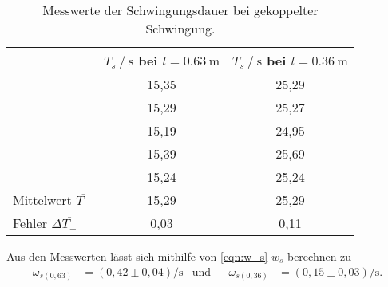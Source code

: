 \begin{table}[H]
  \centering
  \caption{Messwerte der Schwingungsdauer bei gekoppelter Schwingung.}
  \label{tab:Ts}
  \begin{tabular}{l S S}
    \toprule
     & {$T_s \mathbin{/} \si{\second}$ bei $l=\qty{0.63}{\meter}$} & {$T_s \mathbin{/} \si{\second}$ bei $l=\qty{0.36}{\meter}$}\\
    \midrule
      &15,35& 25,29\\
      &15,29& 25,27\\
      &15,19& 24,95\\
      &15,39& 25,69\\
      &15,24& 25,24\\
    \midrule
      Mittelwert $\overline{T_-}$& 15,29 & 25,29\\
      Fehler $\Delta \overline{T_-}$& 0,03 & 0,11\\
    \bottomrule
  \end{tabular}
\end{table}

Aus den Messwerten lässt sich mithilfe von \autoref{eqn:w_s} $w_s$ berechnen zu 
\begin{align*}
  \omega_{s(0,63)}&=(0,42 \pm 0,04) \si{\per\second} & \text{und} && \omega_{s(0,36)}&=(0,15 \pm 0,03) \si{\per\second}.
\end{align*}






